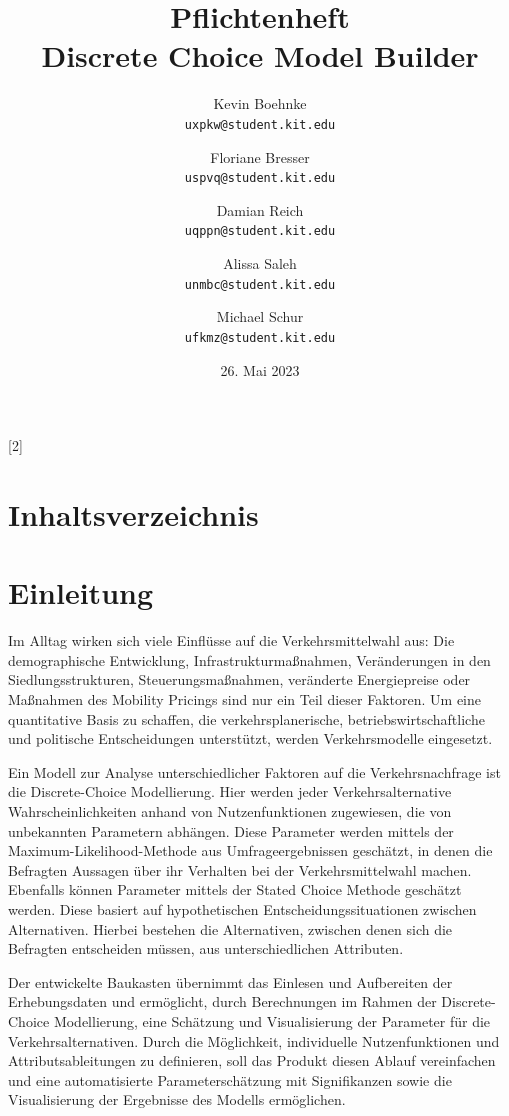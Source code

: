 \documentclass{article}
\title{Pflichtenheft \\ \large Discrete Choice Model Builder}
\author{Kevin Boehnke \\ \texttt{uxpkw@student.kit.edu}
\and Floriane Bresser \\ \texttt{uspvq@student.kit.edu}
\and Damian Reich \\ \texttt{uqppn@student.kit.edu}
\and Alissa Saleh \\ \texttt{unmbc@student.kit.edu}
\and Michael Schur \\ \texttt{ufkmz@student.kit.edu}}
\date{26. Mai 2023}
\begin{document}
\clearpage\maketitle\thispagestyle{empty}
\newpage
\clearpage
\startcontents[maintableofcontents]
[2]{\section*{Inhaltsverzeichnis}}
\thispagestyle{empty}
\newpage
{}


\section{Einleitung}

Im Alltag wirken sich viele Einflüsse auf die Verkehrsmittelwahl aus: Die demographische Entwicklung, Infrastrukturmaßnahmen, Veränderungen in den Siedlungsstrukturen, Steuerungsmaßnahmen, veränderte Energiepreise oder Maßnahmen des Mobility Pricings sind nur ein Teil dieser Faktoren. Um eine quantitative Basis zu schaffen, die verkehrsplanerische, betriebswirtschaftliche und politische Entscheidungen unterstützt, werden Verkehrsmodelle eingesetzt.\newline

Ein Modell zur Analyse unterschiedlicher Faktoren auf die Verkehrsnachfrage ist die Discrete-Choice Modellierung. Hier werden jeder Verkehrsalternative Wahrscheinlichkeiten anhand von Nutzenfunktionen zugewiesen, die von unbekannten Parametern abhängen. Diese Parameter werden mittels der Maximum-Likelihood-Methode aus Umfrageergebnissen geschätzt, in denen die Befragten Aussagen über ihr Verhalten bei der Verkehrsmittelwahl machen. Ebenfalls können Parameter mittels der Stated Choice Methode geschätzt werden. Diese basiert auf hypothetischen Entscheidungssituationen zwischen Alternativen. Hierbei bestehen die Alternativen, zwischen denen sich die Befragten entscheiden müssen, aus unterschiedlichen Attributen. %
\newline

Der entwickelte Baukasten übernimmt das Einlesen und Aufbereiten der Erhebungsdaten und ermöglicht, durch Berechnungen im Rahmen der Discrete-Choice Modellierung, eine Schätzung und Visualisierung der Parameter für die Verkehrsalternativen. Durch die Möglichkeit, individuelle Nutzenfunktionen und Attributsableitungen zu definieren, soll das Produkt diesen Ablauf vereinfachen und eine automatisierte Parameterschätzung mit Signifikanzen sowie die Visualisierung der Ergebnisse des Modells ermöglichen. 
\end{document}
